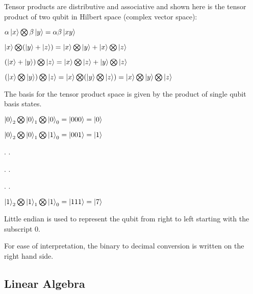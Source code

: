 \documentclass{article}
\begin{document}
\noindent
Tensor products are distributive and associative and shown here is the tensor product of two qubit in Hilbert space (complex vector space):
\vspace{5mm}


\qquad $\alpha\ket{x} \bigotimes \beta\ket{y} = \alpha\beta\ket{xy}$
\vspace{5mm}


\qquad $\ket{x} \bigotimes (\ket{y} + \ket{z}) = \ket{x}\bigotimes \ket{y} + \ket{x}\bigotimes\ket{z}$
\vspace{5mm}


\qquad $(\ket{x} + \ket{y}) \bigotimes \ket{z} = \ket{x}\bigotimes \ket{z} + \ket{y}\bigotimes\ket{z}$
\vspace{5mm}


\qquad $(\ket{x} \bigotimes \ket{y}) \bigotimes \ket{z} = \ket{x} \bigotimes (\ket{y} \bigotimes\ket{z}) = \ket{x} \bigotimes \ket{y} \bigotimes\ket{z}$
\vspace{10mm}

The basis for the tensor product space is given by the product of single qubit basis states.
\vspace{5mm}

\qquad $\ket{0}_2 \bigotimes \ket{0}_1 \bigotimes \ket{0}_0 = \ket{000} = \ket{0}$
\vspace{5mm}

\qquad $\ket{0}_2 \bigotimes \ket{0}_1 \bigotimes \ket{1}_0 = \ket{001} = \ket{1}$
\vspace{5mm}

\qquad \qquad \qquad . \qquad \qquad .

\qquad \qquad \qquad . \qquad \qquad .

\qquad \qquad \qquad . \qquad \qquad .

\qquad $\ket{1}_2 \bigotimes \ket{1}_1 \bigotimes \ket{1}_0 = \ket{111} = \ket{7}$
\vspace{5mm}

Little endian is used to represent the qubit from right to left starting with the subscript 0.

For ease of interpretation, the binary to decimal conversion is written on the right hand side. 
\pagebreak





\subsection{Linear Algebra}
\vspace{5mm}
\end{document}
